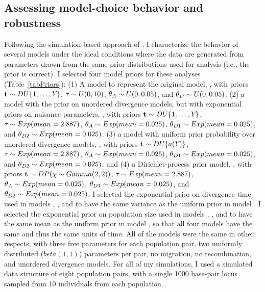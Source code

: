 \subsection{Assessing model-choice behavior and robustness}
Following the simulation-based approach of \citet{Oaks2012}, I characterize
the behavior of several models under the ideal conditions where the
data are generated from parameters drawn from the same prior distributions used
for analysis (i.e., the prior is correct).
I selected four model priors for these analyses (Table~\ref{tabPriors}):
(1) A model to represent the original \msb model, \modelOld, with
priors
$\mathbf{t_{}} \sim DU\{1, \ldots, Y_{}\}$,
$\tau_{} \sim U(0,10)$,
$\ancestralTheta{} \sim U(0, 0.05)$,
and
$\descendantThetaMean{} \sim U(0, 0.05)$;
(2) a model with the \msb prior on unordered divergence models, but with
exponential priors on nuisance parameters,
\modelUshaped, with priors
$\mathbf{t_{}} \sim DU\{1, \ldots, Y_{}\}$,
$\tau_{} \sim Exp(mean=2.887)$,
$\ancestralTheta{} \sim Exp(mean=0.025)$,
$\descendantTheta{1}{} \sim Exp(mean=0.025)$,
and
$\descendantTheta{2}{} \sim Exp(mean=0.025)$.
(3) a model with uniform prior probability over unordered divergence models,
\modelUniform, with priors
$\mathbf{t_{}} \sim DU\{a({Y_{}})\}$,
$\tau_{} \sim Exp(mean=2.887)$,
$\ancestralTheta{} \sim Exp(mean=0.025)$,
$\descendantTheta{1}{} \sim Exp(mean=0.025)$,
and
$\descendantTheta{2}{} \sim Exp(mean=0.025)$.
and
(4) a Dirichlet-process prior model, \modelDPP, with priors
$\mathbf{t_{}} \sim DP(\chi \sim Gamma(2,2))$,
$\tau_{} \sim Exp(mean=2.887)$,
$\ancestralTheta{} \sim Exp(mean=0.025)$,
$\descendantTheta{1}{} \sim Exp(mean=0.025)$,
and
$\descendantTheta{2}{} \sim Exp(mean=0.025)$.
I selected the exponential prior on divergence time used in models \modelDPP,
\modelUniform, and \modelUshaped to have the same variance as the uniform prior
in model \modelOld.
I selected the exponential prior on population size used in models \modelDPP,
\modelUniform, and \modelUniform to have the same mean as the uniform prior in
model \modelOld, so that all four models have the same  and thus the
same units of time.
All of the models were the same in other respects, with three free \myTheta{}
parameters for each population pair, two uniformly distributed ($beta(1,1)$)
\bottleScalar{}{} parameters per pair, no migration, no recombination,
and unordered divergence models.
For all of my simulations, I used a simulated data structure of eight
population pairs, with a single 1000 base-pair locus sampled from 10
individuals from each population.

